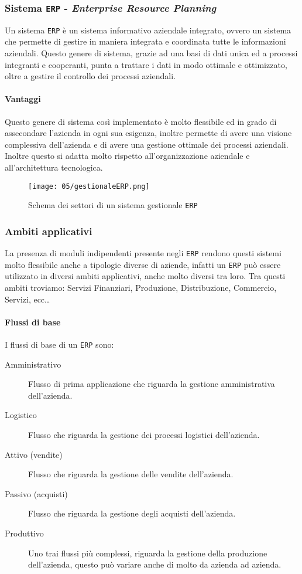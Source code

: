     \subsubsection{Sistema \texttt{ERP} - \textit{Enterprise Resource Planning}}
        Un sistema \texttt{ERP} è un sistema informativo aziendale integrato, ovvero un sistema che permette di gestire in maniera integrata e coordinata tutte le informazioni aziendali. Questo genere di sistema, grazie ad una basi di dati unica ed a processi integranti e cooperanti, punta a trattare i dati in modo ottimale e ottimizzato, oltre a gestire il controllo dei processi aziendali.
        \paragraph{Vantaggi} Questo genere di sistema così implementato è molto flessibile ed in grado di assecondare l'azienda in ogni sua esigenza, inoltre permette di avere una visione complessiva dell'azienda e di avere una gestione ottimale dei processi aziendali. Inoltre questo si adatta molto rispetto all'organizzazione aziendale e all'architettura tecnologica.
        \begin{figure}[H]
            \centering
            \texttt{[image: 05/gestionaleERP.png]}
            \caption{Schema dei settori di un sistema gestionale \texttt{ERP}}
        \end{figure}
    \subsubsection{Ambiti applicativi}
        La presenza di moduli indipendenti presente negli \texttt{ERP} rendono questi sistemi molto flessibile anche a tipologie diverse di aziende, infatti un \texttt{ERP} può essere utilizzato in diversi ambiti applicativi, anche molto diversi tra loro. Tra questi ambiti troviamo: Servizi Finanziari, Produzione, Distribuzione, Commercio, Servizi, ecc\dots
        \paragraph{Flussi di base} I flussi di base di un \texttt{ERP} sono:
        \begin{description}
            \item[Amministrativo] Flusso di prima applicazione che riguarda la gestione amministrativa dell'azienda.
            \item[Logistico] Flusso che riguarda la gestione dei processi logistici dell'azienda.
            \item[Attivo (vendite)] Flusso che riguarda la gestione delle vendite dell'azienda.
            \item[Passivo (acquisti)] Flusso che riguarda la gestione degli acquisti dell'azienda.
            \item[Produttivo] Uno trai flussi più complessi, riguarda la gestione della produzione dell'azienda, questo può variare anche di molto da azienda ad azienda. 
        \end{description}
